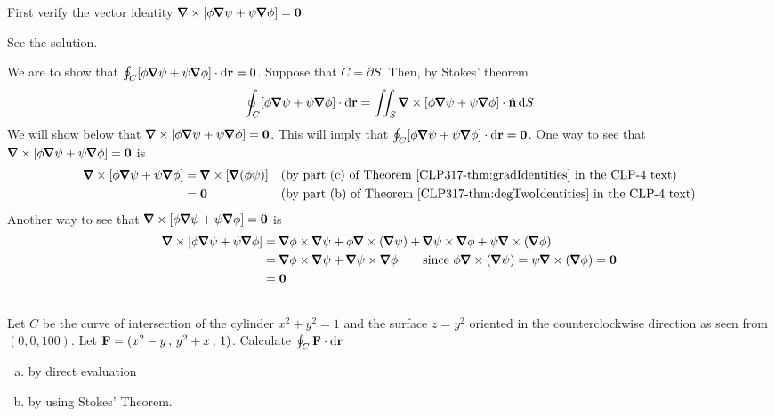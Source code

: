 \begin{hint} 
First verify the vector identity 
$\vnabla\times[\phi\vnabla\psi+\psi\vnabla\phi]=\vZero$
\end{hint}

\begin{answer} 
See the solution.
\end{answer}

\begin{solution} 
We are to show that $\oint_C[\phi\vnabla\psi+\psi\vnabla\phi]\cdot \dee{\vr}=0$.
 Suppose that $C=\partial S$. Then, by Stokes' theorem
\begin{equation*}
\oint_C[\phi\vnabla\psi+\psi\vnabla\phi]\cdot \dee{\vr}
=\dblInt_S\vnabla\times[\phi\vnabla\psi+\psi\vnabla\phi]\cdot\hn\, \dee{S}
\end{equation*}
We will show below %
that $\vnabla\times[\phi\vnabla\psi+\psi\vnabla\phi]=\vZero$.
This will imply that $\oint_C[\phi\vnabla\psi+\psi\vnabla\phi]\cdot \dee{\vr}=\vZero$.
One way to see that $\vnabla\times[\phi\vnabla\psi+\psi\vnabla\phi]=\vZero$
is
\begin{align*}
\vnabla\times[\phi\vnabla\psi+\psi\vnabla\phi]
&=\vnabla\times[\vnabla(\phi\psi)] &
&\text{(by part (c) of Theorem \eref{CLP317}{thm:gradIdentities} in the CLP-4 text)}\\
&=\vZero&
&\text{(by part (b) of Theorem \eref{CLP317}{thm:degTwoIdentities} in the CLP-4 text)}
\end{align*}
Another way to see that $\vnabla\times[\phi\vnabla\psi+\psi\vnabla\phi]=\vZero$
is
\begin{align*}
\vnabla\times[\phi\vnabla\psi+\psi\vnabla\phi]
&=\vnabla\phi\times\vnabla\psi+\phi\vnabla\times(\vnabla\psi)
+\vnabla\psi\times\vnabla\phi+\psi\vnabla\times(\vnabla\phi)\\
&=\vnabla\phi\times\vnabla\psi
+\vnabla\psi\times\vnabla\phi\qquad\text{since $\phi\vnabla\times(\vnabla\psi)=\psi\vnabla\times(\vnabla\phi)=\vZero$}\\
&=\vZero
\end{align*}
\end{solution}



\subsection*{\Procedural}

\begin{question}
 Let $C$ be the curve of intersection of the cylinder $x^2+y^2=1$
and the surface $z=y^2$ oriented in the counterclockwise direction as seen
from $(0,0,100)$. Let $\mathbf{F}=(x^2-y\,,\,y^2+x\,,\,1)$. Calculate 
$\oint_C\mathbf{F}\cdot \mathrm{d}\mathbf{r}$
\begin{enumerate}[(a)]
\item by direct evaluation
\item by using Stokes' Theorem.
\end{enumerate}
\end{question}

